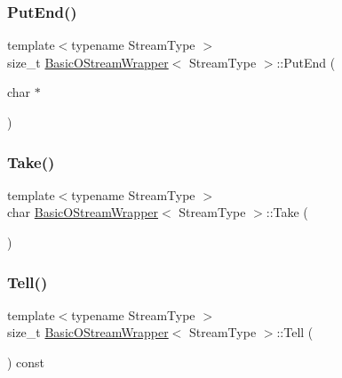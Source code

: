 \mbox{\label{classBasicOStreamWrapper_a1da108e43a5a517c4484821fced1fca0}} 
\subsubsection{\texorpdfstring{Put\+End()}{PutEnd()}}
{\footnotesize\ttfamily template$<$typename Stream\+Type $>$ \\
size\+\_\+t \hyperlink{classBasicOStreamWrapper}{Basic\+O\+Stream\+Wrapper}$<$ Stream\+Type $>$\+::Put\+End (\begin{DoxyParamCaption}\item[{char $\ast$}]{ }\end{DoxyParamCaption})\hspace{0.3cm}{\ttfamily [inline]}}

\mbox{\label{classBasicOStreamWrapper_a54be63e8d24f4d82329b860a907f65fe}} 
\subsubsection{\texorpdfstring{Take()}{Take()}}
{\footnotesize\ttfamily template$<$typename Stream\+Type $>$ \\
char \hyperlink{classBasicOStreamWrapper}{Basic\+O\+Stream\+Wrapper}$<$ Stream\+Type $>$\+::Take (\begin{DoxyParamCaption}{ }\end{DoxyParamCaption})\hspace{0.3cm}{\ttfamily [inline]}}

\mbox{\label{classBasicOStreamWrapper_a62f214649fbfb8380a69fe92b864a61b}} 
\subsubsection{\texorpdfstring{Tell()}{Tell()}}
{\footnotesize\ttfamily template$<$typename Stream\+Type $>$ \\
size\+\_\+t \hyperlink{classBasicOStreamWrapper}{Basic\+O\+Stream\+Wrapper}$<$ Stream\+Type $>$\+::Tell (\begin{DoxyParamCaption}{ }\end{DoxyParamCaption}) const\hspace{0.3cm}{\ttfamily [inline]}}



